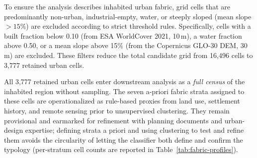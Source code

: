 To ensure the analysis describes inhabited urban fabric, grid cells that are predominantly non-urban, industrial-empty, water, or steeply sloped (mean slope $>15\%$) are excluded according to strict threshold rules. Specifically, cells with a built fraction below 0.10 (from ESA WorldCover 2021, 10\,m), a water fraction above 0.50, or a mean slope above 15\% (from the Copernicus GLO-30 DEM, 30\,m) are excluded. These filters reduce the total candidate grid from 16{,}496 cells to 3{,}777 retained urban cells.

All 3{,}777 retained urban cells enter downstream analysis as a \emph{full census} of the inhabited region without sampling. The seven a-priori fabric strata assigned to these cells are operationalized as rule-based proxies from land use, settlement history, and remote sensing prior to unsupervised clustering. They remain provisional and earmarked for refinement with planning documents and urban-design expertise; defining strata a priori and using clustering to test and refine them avoids the circularity of letting the classifier both define and confirm the typology (per-stratum cell counts are reported in Table~\ref{tab:fabric-profiles}).


